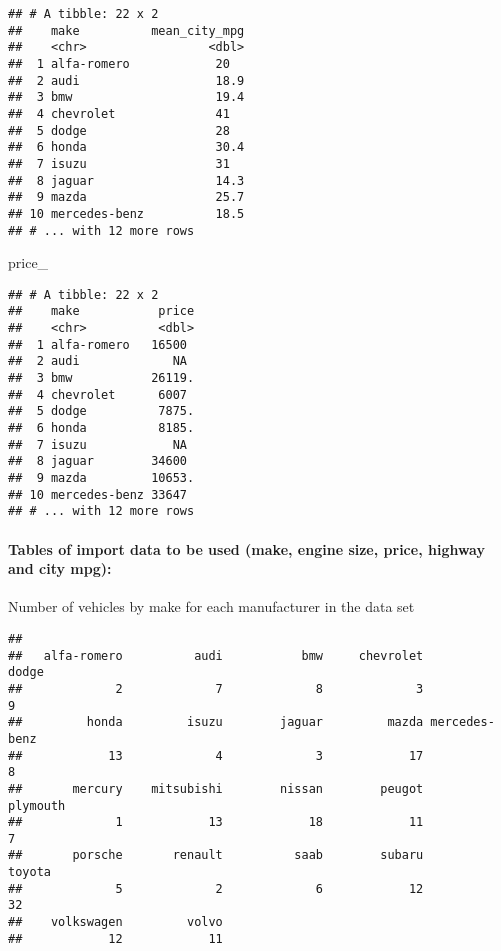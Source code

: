 \documentclass[
]{article}
\newenvironment{Shaded}{\begin{snugshade}}{\end{snugshade}}
\newcommand{\FunctionTok}[1]{\textcolor[rgb]{0.00,0.00,0.00}{#1}}
\newcommand{\NormalTok}[1]{#1}
\newcommand{\SpecialCharTok}[1]{\textcolor[rgb]{0.00,0.00,0.00}{#1}}
\begin{document}
\begin{verbatim}
## # A tibble: 22 x 2
##    make          mean_city_mpg
##    <chr>                 <dbl>
##  1 alfa-romero            20  
##  2 audi                   18.9
##  3 bmw                    19.4
##  4 chevrolet              41  
##  5 dodge                  28  
##  6 honda                  30.4
##  7 isuzu                  31  
##  8 jaguar                 14.3
##  9 mazda                  25.7
## 10 mercedes-benz          18.5
## # ... with 12 more rows
\end{verbatim}

\begin{Shaded}
\begin{Highlighting}[]
\NormalTok{price\_}
\end{Highlighting}
\end{Shaded}

\begin{verbatim}
## # A tibble: 22 x 2
##    make           price
##    <chr>          <dbl>
##  1 alfa-romero   16500 
##  2 audi             NA 
##  3 bmw           26119.
##  4 chevrolet      6007 
##  5 dodge          7875.
##  6 honda          8185.
##  7 isuzu            NA 
##  8 jaguar        34600 
##  9 mazda         10653.
## 10 mercedes-benz 33647 
## # ... with 12 more rows
\end{verbatim}

\hypertarget{tables-of-import-data-to-be-used-make-engine-size-price-highway-and-city-mpg}{%
\paragraph{Tables of import data to be used (make, engine size, price,
highway and city
mpg):}\label{tables-of-import-data-to-be-used-make-engine-size-price-highway-and-city-mpg}}

Number of vehicles by make for each manufacturer in the data set

\begin{Shaded}
\end{Shaded}

\begin{verbatim}
## 
##   alfa-romero          audi           bmw     chevrolet         dodge 
##             2             7             8             3             9 
##         honda         isuzu        jaguar         mazda mercedes-benz 
##            13             4             3            17             8 
##       mercury    mitsubishi        nissan        peugot      plymouth 
##             1            13            18            11             7 
##       porsche       renault          saab        subaru        toyota 
##             5             2             6            12            32 
##    volkswagen         volvo 
##            12            11
\end{verbatim}
\end{document}
